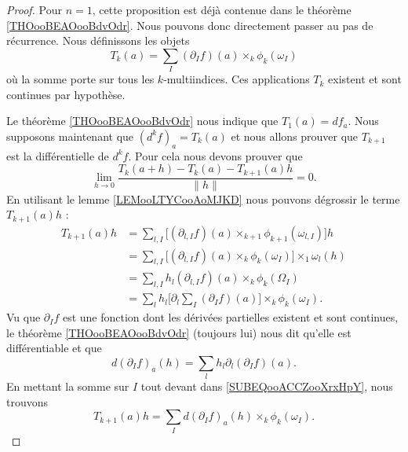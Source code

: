 \begin{proof}
	Pour \( n=1\), cette proposition est déjà contenue dans le théorème \ref{THOooBEAOooBdvOdr}. Nous pouvons donc directement passer au pas de récurrence. Nous définissons les objets
	\begin{equation}
		T_k(a)=\sum_I(\partial_If)(a)\times_k\phi_k(\omega_{I})
	\end{equation}
	où la somme porte sur tous les \( k\)-multiindices. Ces applications \( T_k\) existent et sont continues par hypothèse.

	Le théorème \ref{THOooBEAOooBdvOdr} nous indique que \( T_1(a)=df_a\). Nous supposons maintenant que \( (d^kf)_a=T_k(a)\) et nous allons prouver que \( T_{k+1}\) est la différentielle de \( d^kf\). Pour cela nous devons prouver que
	\begin{equation}        \label{EQooPKXDooWWVikT}
		\lim_{h\to 0} \frac{ T_k(a+h)-T_k(a)-T_{k+1}(a)h }{ \| h \| }=0.
	\end{equation}
	En utilisant le lemme \ref{LEMooLTYCooAoMJKD} nous pouvons dégrossir le terme \( T_{k+1}(a)h\) :
	\begin{subequations}
		\begin{align}
			T_{k+1}(a)h & =\sum_{l,I}\big[ (\partial_{l,I}f)(a)\times_{k+1}\phi_{k+1}(\omega_{l,I}) \big]h                                   \\
			            & =\sum_{l,I}\big[ (\partial_{l,I}f)(a)\times_k\phi_k(\omega_I) \big]\times_1\omega_l(h)                             \\
			            & =\sum_{l,I}h_l(\partial_{l,I}f)(a)\times_k\phi_k(\Omega_I)                                                         \\
			            & =\sum_lh_l\big[ \partial_l\sum_I(\partial_If)(a) \big]\times_k\phi_k(\omega_I).        \label{SUBEQooACCZooXrxHpY}
		\end{align}
	\end{subequations}
	Vu que \( \partial_If\) est une fonction dont les dérivées partielles existent et sont continues, le théorème \ref{THOooBEAOooBdvOdr} (toujours lui) nous dit qu'elle est différentiable et que
	\begin{equation}
		d(\partial_If)_a(h)=\sum_lh_l\partial_l(\partial_If)(a).
	\end{equation}
	En mettant la somme sur \( I\) tout devant dans \eqref{SUBEQooACCZooXrxHpY}, nous trouvons
	\begin{equation}
		T_{k+1}(a)h=\sum_Id(\partial_If)_a(h)\times_k\phi_k(\omega_I).
	\end{equation}

\end{proof}
